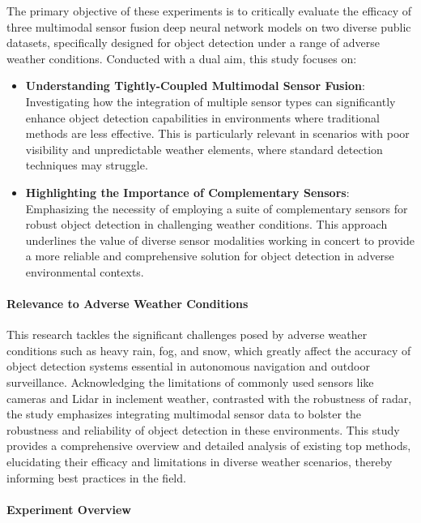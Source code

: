 \documentclass[report.tex]{subfiles}
\begin{document}
    The primary objective of these experiments is to critically evaluate the efficacy of three multimodal sensor fusion deep neural network models on two diverse public datasets, specifically designed for object detection under a range of adverse weather conditions. Conducted with a dual aim, this study focuses on:

    \begin{itemize}
        \item \textbf{Understanding Tightly-Coupled Multimodal Sensor Fusion}: Investigating how the integration of multiple sensor types can significantly enhance object detection capabilities in environments where traditional methods are less effective. This is particularly relevant in scenarios with poor visibility and unpredictable weather elements, where standard detection techniques may struggle.
        \item \textbf{Highlighting the Importance of Complementary Sensors}: Emphasizing the necessity of employing a suite of complementary sensors for robust object detection in challenging weather conditions. This approach underlines the value of diverse sensor modalities working in concert to provide a more reliable and comprehensive solution for object detection in adverse environmental contexts.
    \end{itemize}

    \paragraph*{Relevance to Adverse Weather Conditions}

    This research tackles the significant challenges posed by adverse weather conditions such as heavy rain, fog, and snow, which greatly affect the accuracy of object detection systems essential in autonomous navigation and outdoor surveillance. Acknowledging the limitations of commonly used sensors like cameras and Lidar in inclement weather, contrasted with the robustness of radar, the study emphasizes integrating multimodal sensor data to bolster the robustness and reliability of object detection in these environments. This study provides a comprehensive overview and detailed analysis of existing top methods, elucidating their efficacy and limitations in diverse weather scenarios, thereby informing best practices in the field.

    \paragraph*{Experiment Overview}
\end{document}
